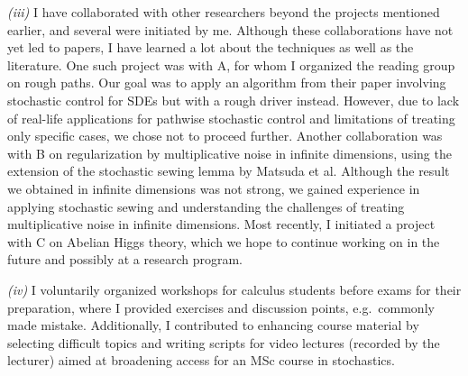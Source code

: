 \documentclass[./Research_statement.tex]{subfiles}
\begin{document}
\noindent \textit{(iii)} I have collaborated with other researchers beyond the projects mentioned earlier, and several were initiated by me. Although these collaborations have not yet led to papers, I have learned a lot about the techniques as well as the literature. One such project was with A, for whom I organized the reading group on rough paths. Our goal was to apply an algorithm from their paper involving stochastic control for SDEs but with a rough driver instead. However, due to  lack of real-life applications for pathwise stochastic control and limitations of treating only specific cases, we chose not to proceed further. Another collaboration was with B on regularization by multiplicative noise in infinite dimensions, using the extension of the stochastic sewing lemma by Matsuda et al. Although the result we obtained in infinite dimensions was not strong, we gained experience in applying stochastic sewing and understanding the challenges of treating multiplicative noise in infinite dimensions. Most recently, I initiated a project with C on Abelian Higgs theory, which we hope to continue working on in the future and possibly at a research program.



\vspace{2pt}

\noindent \textit{(iv)}
I voluntarily organized workshops for calculus students before exams for their preparation, where I provided exercises and discussion points, e.g.\ commonly made mistake. Additionally, I contributed to enhancing course material by selecting difficult topics and writing scripts for video lectures (recorded by the lecturer) aimed at broadening access for an MSc course in stochastics. 
\end{document}
